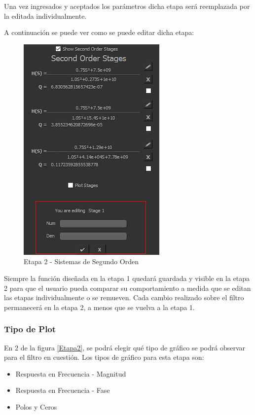 Una vez ingresados y aceptados los parámetros dicha etapa será reemplazada por la editada individualmente.

A continuación se puede ver como se puede editar dicha etapa:

\begin{figure}[H]
    \centering
    \includegraphics[scale=0.5]{../Ejercicio1-FilterTool/Imagenes/sosEdit.png}
    \caption{Etapa 2 - Sistemas de Segundo Orden}
\end{figure}

Siempre la función diseñada en la etapa 1 quedará guardada y visible en la etapa 2 para que el usuario pueda comparar su comportamiento a medida
que se editan las etapas individualmente o se remueven. Cada cambio realizado sobre el filtro permanecerá en la etapa 2, a menos que se vuelva a la etapa 1.

\subsubsection{Tipo de Plot}

En $2$ de la figura \ref{Etapa2}, se podrá elegir qué tipo de gráfico se podrá observar para el filtro en cuestión. Los tipos de gráfico para esta etapa son:


\begin{itemize}
	\item Respuesta en Frecuencia - Magnitud
	\item Respuesta en Frecuencia - Fase
	\item Polos y Ceros
\end{itemize}

